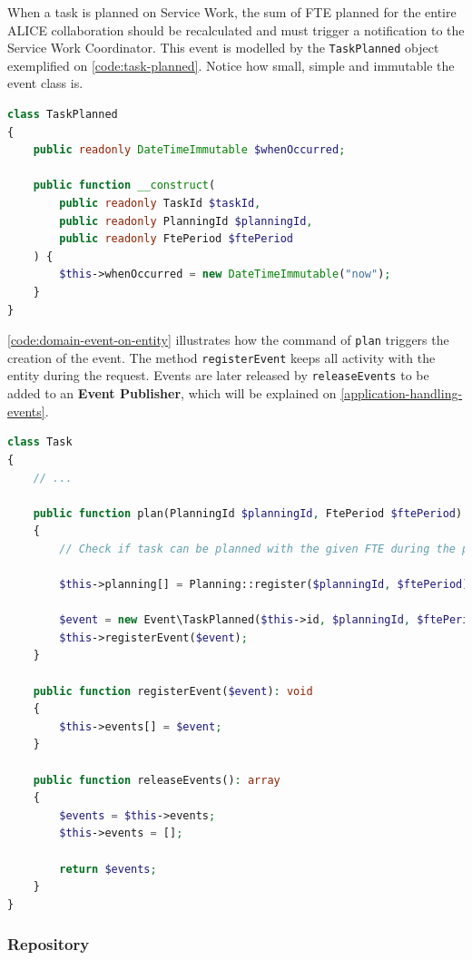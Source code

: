 When a task is planned on Service Work, the sum of FTE planned for the entire ALICE collaboration should be recalculated and must trigger a notification to the Service Work Coordinator. This event is modelled by the \texttt{TaskPlanned} object exemplified on \autoref{code:task-planned}. Notice how small, simple and immutable the event class is.

\begin{lstlisting}[language=PHP,label={code:task-planned},caption={Event to model the domain concept of ``a task was planned''.}]
class TaskPlanned
{
	public readonly DateTimeImmutable $whenOccurred;

	public function __construct(
		public readonly TaskId $taskId,
		public readonly PlanningId $planningId,
		public readonly FtePeriod $ftePeriod
	) {
		$this->whenOccurred = new DateTimeImmutable("now");
	}
}
\end{lstlisting}

\autoref{code:domain-event-on-entity} illustrates how the command of \texttt{plan} triggers the creation of the event. The method \texttt{registerEvent} keeps all activity with the entity during the request. Events are later released by \texttt{releaseEvents} to be added to an \textbf{Event Publisher}, which will be explained on \autoref{application-handling-events}.

\begin{lstlisting}[language=PHP,label={code:domain-event-on-entity},caption={Example of the \texttt{Task} entity coordinating the \texttt{TaskPlanned} event.}]
class Task
{
    // ...

    public function plan(PlanningId $planningId, FtePeriod $ftePeriod): void
    {
	    // Check if task can be planned with the given FTE during the period...

		$this->planning[] = Planning::register($planningId, $ftePeriod);

		$event = new Event\TaskPlanned($this->id, $planningId, $ftePeriod);
		$this->registerEvent($event);
    }

	public function registerEvent($event): void
	{
		$this->events[] = $event;
	}

	public function releaseEvents(): array
	{
		$events = $this->events;
		$this->events = [];

		return $events;
	}
}
\end{lstlisting}

\subsubsection{Repository}
\label{sec:repository-interface}

